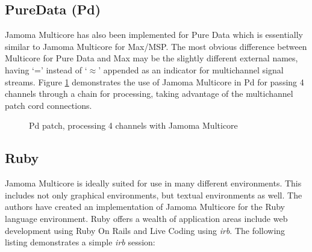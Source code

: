 \documentclass[twoside,a4paper]{article}
\begin{document}


\subsection{PureData (Pd)} %

Jamoma Multicore has also been implemented for Pure Data which is essentially similar to Jamoma Multicore for Max/MSP. 
The most obvious difference between Multicore for Pure Data and Max may be the slightly different external names, having `=' instead of `$\approx$' appended as an indicator for multichannel signal streams. 
Figure \ref{fig:pd} demonstrates the use of Jamoma Multicore in Pd for passing 4 channels through a chain for processing, taking advantage of the multichannel patch cord connections.  

\begin{figure}[htbp]
\centerline{}
\caption{Pd patch, processing 4 channels with Jamoma Multicore}
\label{fig:pd}
\end{figure}



\subsection{Ruby} %

Jamoma Multicore is ideally suited for use in many different environments. 
This includes not only graphical environments, but textual environments as well.  
The authors have created an implementation of Jamoma Multicore for the Ruby language environment.  
Ruby offers a wealth of application areas include web development using Ruby On Rails \cite{Ruby:2009} and Live Coding \cite{Collins:2003} using \emph{irb}.  
The following listing demonstrates a simple \emph{irb} session:
\end{document}
